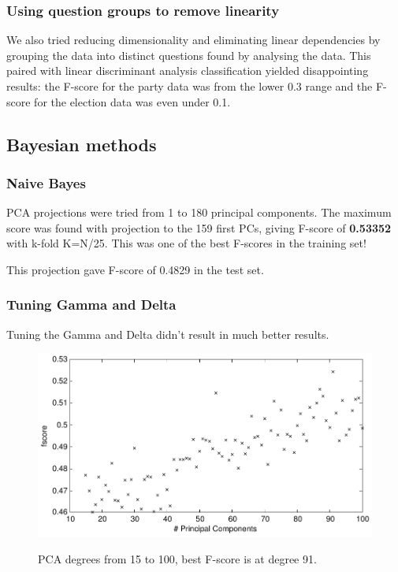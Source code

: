 \documentclass[a4paper,10pt]{article}
\begin{document}
\subsubsection{Using question groups to remove linearity}
We also tried reducing dimensionality and eliminating linear dependencies by grouping the data into distinct questions found by analysing the data. This paired with linear discriminant analysis classification yielded disappointing results: the F-score for the party data was from the lower 0.3 range and the F-score for the election data was even under 0.1.

\subsection{Bayesian methods}
\subsubsection{Naive Bayes}
PCA projections were tried from 1 to 180 principal components. The maximum score was found with projection to the 159 first PCs, giving F-score of {\bf 0.53352} with k-fold K=N/25. This was one of the best F-scores in the training set!

This projection gave F-score of 0.4829 in the test set.

\subsubsection{Tuning Gamma and Delta}
Tuning the Gamma and Delta didn’t result in much better results.

\begin{figure}
\begin{center}
	\caption{PCA degrees from 15 to 100, best F-score is at degree 91.}
	{\includegraphics[scale=0.5,angle=0]{./img/bayes_gamma_pca1.pdf}}
	\label{fig:bayesGamma1}
\end{center}
\end{figure}
\end{document}
